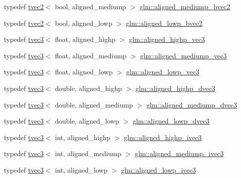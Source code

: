 \begin{DoxyCompactItemize}
\item 
typedef \mbox{\hyperlink{structglm_1_1tvec2}{tvec2}}$<$ bool, aligned\+\_\+mediump $>$ \mbox{\hyperlink{group__gtc__type__aligned_ga6a8eda49fb7f05dc574be67d8988822b}{glm\+::aligned\+\_\+mediump\+\_\+bvec2}}
\item 
typedef \mbox{\hyperlink{structglm_1_1tvec2}{tvec2}}$<$ bool, aligned\+\_\+lowp $>$ \mbox{\hyperlink{group__gtc__type__aligned_gab9dc3bd3ccc5a3a8c30a4bd4b6927782}{glm\+::aligned\+\_\+lowp\+\_\+bvec2}}
\item 
typedef \mbox{\hyperlink{structglm_1_1tvec3}{tvec3}}$<$ float, aligned\+\_\+highp $>$ \mbox{\hyperlink{group__gtc__type__aligned_ga69a63faccd6a139ff97748c81a603d50}{glm\+::aligned\+\_\+highp\+\_\+vec3}}
\item 
typedef \mbox{\hyperlink{structglm_1_1tvec3}{tvec3}}$<$ float, aligned\+\_\+mediump $>$ \mbox{\hyperlink{group__gtc__type__aligned_ga26e1bf19f9506f2b36949687d927fe63}{glm\+::aligned\+\_\+mediump\+\_\+vec3}}
\item 
typedef \mbox{\hyperlink{structglm_1_1tvec3}{tvec3}}$<$ float, aligned\+\_\+lowp $>$ \mbox{\hyperlink{group__gtc__type__aligned_ga19ab3efcfafe1def4240723f7056ca79}{glm\+::aligned\+\_\+lowp\+\_\+vec3}}
\item 
typedef \mbox{\hyperlink{structglm_1_1tvec3}{tvec3}}$<$ double, aligned\+\_\+highp $>$ \mbox{\hyperlink{group__gtc__type__aligned_ga8f0cf063fb87e4bd3a26ec242a71d75d}{glm\+::aligned\+\_\+highp\+\_\+dvec3}}
\item 
typedef \mbox{\hyperlink{structglm_1_1tvec3}{tvec3}}$<$ double, aligned\+\_\+mediump $>$ \mbox{\hyperlink{group__gtc__type__aligned_ga1ba09491d449d986ea0d63172e96a598}{glm\+::aligned\+\_\+mediump\+\_\+dvec3}}
\item 
typedef \mbox{\hyperlink{structglm_1_1tvec3}{tvec3}}$<$ double, aligned\+\_\+lowp $>$ \mbox{\hyperlink{group__gtc__type__aligned_ga858a0e5240ebf37327c00aa040e5ed42}{glm\+::aligned\+\_\+lowp\+\_\+dvec3}}
\item 
typedef \mbox{\hyperlink{structglm_1_1tvec3}{tvec3}}$<$ int, aligned\+\_\+highp $>$ \mbox{\hyperlink{group__gtc__type__aligned_gac7f1892e381baa066488c0b6d1bf16ad}{glm\+::aligned\+\_\+highp\+\_\+ivec3}}
\item 
typedef \mbox{\hyperlink{structglm_1_1tvec3}{tvec3}}$<$ int, aligned\+\_\+mediump $>$ \mbox{\hyperlink{group__gtc__type__aligned_gad97de0d98f61227f3504dcd5f965ff3a}{glm\+::aligned\+\_\+mediump\+\_\+ivec3}}
\item 
typedef \mbox{\hyperlink{structglm_1_1tvec3}{tvec3}}$<$ int, aligned\+\_\+lowp $>$ \mbox{\hyperlink{group__gtc__type__aligned_ga1d549dde64a05e6fcbc23a73563a077c}{glm\+::aligned\+\_\+lowp\+\_\+ivec3}}

\end{DoxyCompactItemize}
